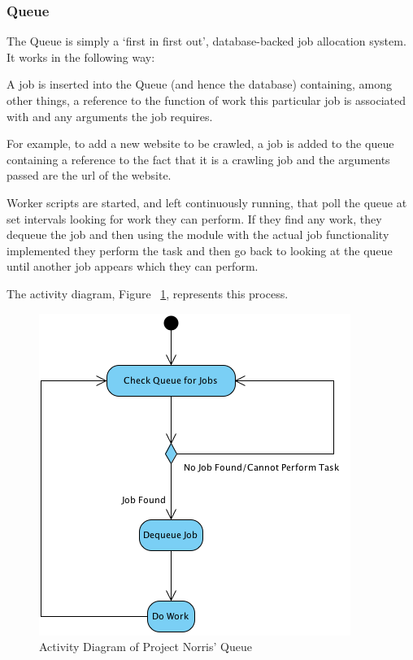 \documentclass[12pt,a4paper]{article}
\begin{document}
\subsubsection{Queue}
The Queue is simply a `first in first out', database-backed job allocation system.  It works in the following way:

A job is inserted into the Queue (and hence the database) containing, among other things, a reference to the function of work this particular job is associated with and any arguments the job requires.

For example, to add a new website to be crawled, a job is added to the queue containing a reference to the fact that it is a crawling job and the arguments passed are the url of the website.

Worker scripts are started, and left continuously running, that poll the queue at set intervals looking for work they can perform.  If they find any work, they dequeue the job and then using the module with the actual job functionality implemented they perform the task and then go back to looking at the queue until another job appears which they can perform.

The activity diagram, Figure ~\ref{fig:queue}, represents this process.

\begin{figure}[!ht]
    \begin{center}
        \includegraphics[scale=0.4]{images/queue_activity_diagram.png}    
    \end{center}
    \caption{Activity Diagram of Project Norris' Queue}
    \label{fig:queue}
\end{figure}
\end{document}
